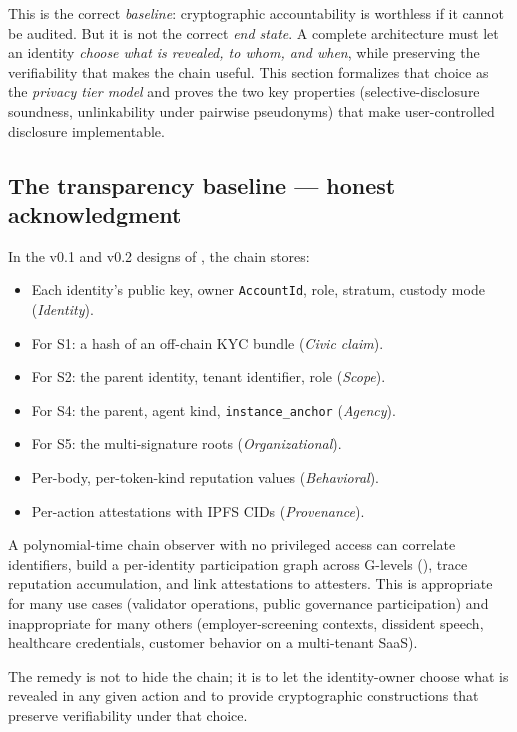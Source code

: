\documentclass[11pt,a4paper,parskip=half-,DIV=12,headings=standardclasses]{scrartcl}
\theoremstyle{ncthm}
\theoremstyle{ncdef}
\begin{document}
This is the correct \emph{baseline}: cryptographic accountability is
worthless if it cannot be audited. But it is not the correct
\emph{end state}. A complete architecture must let an identity
\emph{choose what is revealed, to whom, and when}, while preserving
the verifiability that makes the chain useful. This section
formalizes that choice as the \emph{privacy tier model} and proves
the two key properties (selective-disclosure soundness, unlinkability
under pairwise pseudonyms) that make user-controlled disclosure
implementable.

\subsection{The transparency baseline --- honest acknowledgment}

In the v0.1 and v0.2 designs of , the
chain stores:
\begin{itemize}
\item Each identity's public key, owner \texttt{AccountId}, role,
  stratum, custody mode (\emph{Identity}).
\item For S1: a hash of an off-chain KYC bundle (\emph{Civic claim}).
\item For S2: the parent identity, tenant identifier, role (\emph{Scope}).
\item For S4: the parent, agent kind, \texttt{instance\_anchor} (\emph{Agency}).
\item For S5: the multi-signature roots (\emph{Organizational}).
\item Per-body, per-token-kind reputation values (\emph{Behavioral}).
\item Per-action attestations with IPFS CIDs (\emph{Provenance}).
\end{itemize}

A polynomial-time chain observer with no privileged access can
correlate identifiers, build a per-identity participation graph
across G-levels (), trace reputation
accumulation, and link attestations to attesters. This is appropriate
for many use cases (validator operations, public governance
participation) and inappropriate for many others (employer-screening
contexts, dissident speech, healthcare credentials, customer
behavior on a multi-tenant SaaS).

The remedy is not to hide the chain; it is to let the identity-owner
choose what is revealed in any given action and to provide
cryptographic constructions that preserve verifiability under that
choice.
\end{document}
